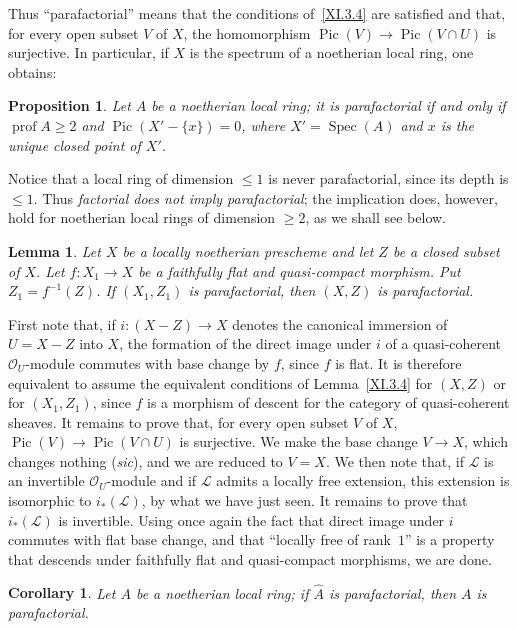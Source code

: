 \documentclass[11pt,a4paper,oneside]{book}
\providecommand{\sisi}[2]{#2}
\providecommand{\pageoriginale}{%
  \refstepcounter{pageoriginal}%
  \marginpar{\raggedright\footnotesize\bfseries\thepageoriginal}%
  \xspace}
\providecommand{\og}{``}
\providecommand{\fg}{''\xspace}
\providecommand{\Oo}{\mathcal O}
\providecommand{\Lcal}{\mathcal L}
\providecommand{\Spec}{\operatorname{Spec}}
\providecommand{\Pic}{\operatorname{Pic}}
\providecommand{\prof}{\operatorname{prof}}
\theoremstyle{plain}
\newtheorem{corollaire}[subsection]{Corollary}
\newtheorem{lemme}[subsection]{Lemma}
\newtheorem{proposition}[subsection]{Proposition}
\theoremstyle{definition}
\theoremstyle{remark}
\renewcommand{\Ref}[1]{\textup{\ref{#1}}}
\begin{document}
Thus \og parafactorial\fg means that the conditions of~\Ref{XI.3.4} are satisfied and that, for every open subset $V$ of $X$, the homomorphism $\Pic(V)\to\Pic(V\cap U)$ is surjective. In particular, if $X$ is the spectrum of a noetherian local ring, one obtains:

\begin{proposition} \label{XI.3.5}
Let $A$ be a noetherian local ring; it is parafactorial if and only if $\prof A\geq 2$ and $\Pic(X'-\{x\})=0$, where $X'=\Spec(A)$ and $x$ is the unique closed point of $X'$.
\end{proposition}

Notice that a local ring of dimension $\leq 1$ is never parafactorial, since its depth is $\leq 1$. Thus \emph{factorial does not imply parafactorial}; the implication does, however, hold for noetherian local rings of dimension $\geq 2$, as we shall see below.

\begin{lemme} \label{XI.3.6} Let $X$ be a locally noetherian prescheme and let $Z$ be a closed subset of $X$. Let $f\colon X_1\to X$ be a faithfully flat and quasi-compact morphism. Put $Z_1=f^{-1}(Z)$. If $(X_1, Z_1)$ is parafactorial, then $(X, Z)$ is parafactorial.
\end{lemme}

First note\pageoriginale that, if $i\colon(X-Z)\to X$ denotes the canonical immersion of $U=X-Z$ into $X$, the formation of the direct image under $i$ of a quasi-coherent $\Oo_U$-module commutes with base change by $f$, since $f$ is flat. It is therefore equivalent to assume the equivalent conditions of Lemma~\Ref{XI.3.4} for $(X, Z)$ or for $(X_1, Z_1)$, since $f$ is a morphism of descent for the category of quasi-coherent sheaves. It remains to prove that, for every open subset $V$ of $X$, $\Pic(V)\to\Pic(V\cap U)$ is surjective. We make the base change $V\to X$, which changes nothing (\sisi{sic}{\textit{sic}}), and we are reduced to $V=X$. We then note that, if ${\Lcal}$ is an invertible $\Oo_U$-module and if ${\Lcal}$ admits a locally free extension, this extension is isomorphic to $i_*({\Lcal})$, by what we have just seen. It remains to prove that $i_*({\Lcal})$ is invertible. Using once again the fact that direct image under $i$ commutes with flat base change, and that \og locally free of rank~$1$\fg is a property that descends under faithfully flat and quasi-compact morphisms, we are done.

\begin{corollaire} \label{XI.3.7} Let $A$ be a noetherian local ring; if $\hat A$ is parafactorial, then $A$ is parafactorial.
\end{corollaire}
\end{document}
